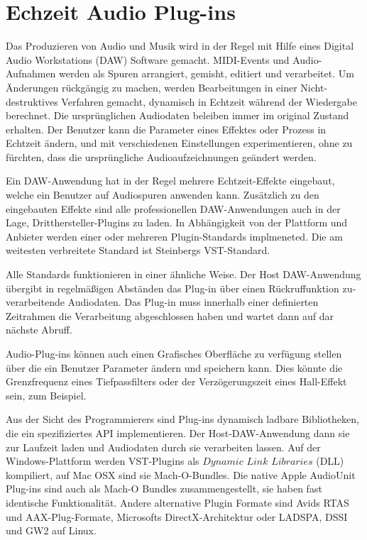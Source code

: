 \section{Echzeit Audio Plug-ins}

Das Produzieren von Audio und Musik wird in der Regel mit Hilfe eines Digital Audio Workstations (DAW) Software gemacht. MIDI-Events und Audio-Aufnahmen werden als Spuren arrangiert, gemisht, editiert und verarbeitet. Um Änderungen rückgängig zu machen, werden Bearbeitungen in einer Nicht-destruktives Verfahren gemacht, dynamisch in Echtzeit während der Wiedergabe berechnet. Die ursprünglichen Audiodaten beleiben immer im original Zustand erhalten. Der Benutzer kann die Parameter eines Effektes oder Prozess in Echtzeit ändern, und mit verschiedenen Einstellungen experimentieren, ohne zu fürchten, dass die ursprüngliche Audioaufzeichnungen geändert werden.

Ein DAW-Anwendung hat in der Regel mehrere Echtzeit-Effekte eingebaut, welche ein Benutzer auf Audiospuren anwenden kann. Zusätzlich zu den eingebauten Effekte sind alle professionellen DAW-Anwendungen auch in der Lage, Dritthersteller-Plugins zu laden. In Abhängigkeit von der Plattform und Anbieter werden einer oder mehreren Plugin-Standards implmeneted. Die am weitesten verbreitete Standard ist Steinbergs VST-Standard.

Alle Standards funktionieren in einer ähnliche Weise. Der Host DAW-Anwendung übergibt in regelmäßigen Abständen das Plug-in über einen Rückruffunktion zu-verarbeitende Audiodaten. Das Plug-in muss innerhalb einer definierten Zeitrahmen die Verarbeitung abgeschlossen haben und wartet dann auf dar nächste Abruff.

Audio-Plug-ins können auch einen Grafisches Oberfläche zu verfügung stellen über die ein Benutzer Parameter ändern und speichern kann. Dies könnte die Grenzfrequenz eines Tiefpassfilters oder der Verzögerungszeit eines Hall-Effekt sein, zum Beispiel.

Aus der Sicht des Programmierers sind Plug-ins dynamisch ladbare Bibliotheken, die ein spezifiziertes API implementieren. Der Host-DAW-Anwendung dann sie zur Laufzeit laden und Audiodaten durch sie verarbeiten lassen\cite{realtime-architectures}. Auf der Windows-Plattform werden VST-Plugins als \(Dynamic\) \(Link\) \(Libraries\) (DLL) kompiliert, auf Mac OSX sind sie Mach-O-Bundles. Die native Apple AudioUnit Plug-ins sind auch als Mach-O Bundles zusammengestellt, sie haben fast identische Funktionalität. Andere alternative Plugin Formate sind Avids RTAS und AAX-Plug-Formate, Microsofts DirectX-Architektur oder LADSPA, DSSI und GW2 auf Linux.

